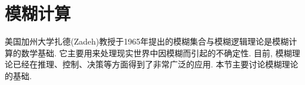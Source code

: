 \section{模糊计算}
美国加州大学扎德(Zadeh)教授于1965年提出的模糊集合与模糊逻辑理论是模糊计算的数学基础. 它主要用来处理现实世界中因模糊而引起的不确定性. 目前, 模糊理论已经在推理、控制、决策等方面得到了非常广泛的应用. 本节主要讨论模糊理论的基础.

